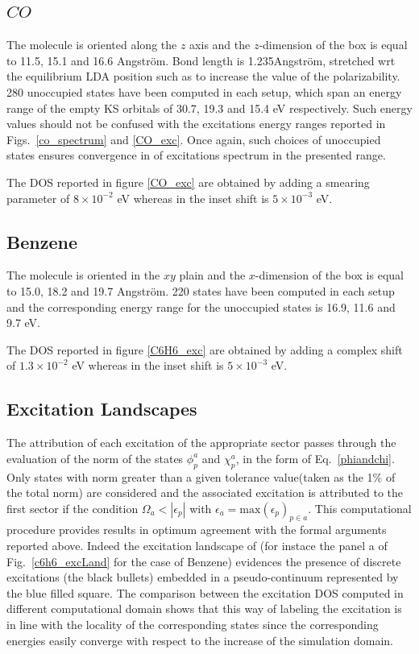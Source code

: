 \documentclass[reprint,aps,prb]{revtex4-1}
\renewcommand{\AA}{{Angstr\"om}}
\begin{document}
\subsection{$CO$}
The molecule is oriented along the $z$ axis and the $z$-dimension of the box is equal to 11.5, 15.1 and 16.6 \AA.
Bond length is 1.235\AA, stretched wrt the equilibrium LDA position such as to increase the value of the polarizability.
280 unoccupied states have been computed in each setup, which span an energy range of the empty KS orbitals of 30.7, 19.3 and 15.4 eV respectively.
Such energy values should not be confused with the excitations energy ranges reported in Figs.~\ref{co_spectrum} and \ref{CO_exc}.
Once again, such choices of unoccupied states ensures convergence in of excitations spectrum in the presented range.

The DOS reported in figure \ref{CO_exc} are obtained by adding a smearing parameter of $8\times 10^{-2}$ eV whereas in the inset shift is $5\times 10^{-3}$ eV.

\subsection{Benzene}
The molecule is oriented in the $xy$ plain and the $x$-dimension of the box is equal to 15.0, 18.2 and 19.7 \AA.
220 states have been computed in each setup and the corresponding
energy range for the unoccupied states is 16.9, 11.6 and 9.7 eV.

The DOS reported in figure \ref{C6H6_exc} are obtained by adding a complex shift of $1.3\times 10^{-2}$ eV whereas in the inset shift is $5\times 10^{-3}$ eV.

\subsection{Excitation Landscapes}
The attribution of each excitation of the appropriate sector passes through the evaluation of the norm of the states $\phi_p^a$ and $\chi_p^a$, in the form of Eq.~\eqref{phiandchi}. Only states with norm greater than a given tolerance value(taken as the 1\% of the total norm) are considered and the associated
excitation is attributed to the first sector if the condition $\Omega_a < |\epsilon_p|$ with $\epsilon_a = \mathrm{max}\left(\epsilon_p\right)_{p\in a}$.
This computational procedure provides results in optimum agreement with the formal arguments reported above. Indeed the excitation landscape of
(for instace the panel a of Fig.~\eqref{c6h6_excLand} for the case of Benzene) evidences the presence of discrete excitations (the black bullets) embedded in a pseudo-continuum
represented by the blue filled square. The comparison between the excitation DOS computed in different computational domain shows that this way of labeling the excitation is in line with the locality of the corresponding states since the corresponding energies easily converge with respect to the increase of the simulation domain.



%

\end{document}
